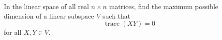 In the linear space of all real \(n \times n\) matrices,
find the maximum possible dimension of a linear subspace \(V\) such that
\[ \quad \operatorname{trace}(XY) = 0\]
for all \(X, Y \in V\).